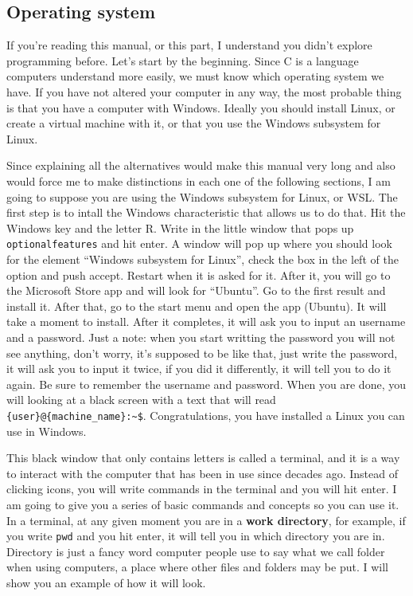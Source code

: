 \documentclass[a4paper]{article}
\begin{document}
\subsection{Operating system}
If you're reading this manual, or this part, I understand you didn't explore
programming before. Let's start by the beginning. Since C is a language
computers understand more easily, we must know which operating system we have.
If you have not altered your computer in any way, the most probable thing is
that you have a computer with Windows. Ideally you should install Linux, or
create a virtual machine with it, or that you use the Windows subsystem for
Linux.

Since explaining all the alternatives would make this manual very long and also
would force me to make distinctions in each one of the following sections, I am
going to suppose you are using the Windows subsystem for Linux, or WSL. The
first step is to intall the Windows characteristic that allows us to
do that. Hit the Windows key and the letter R. Write in the little window that
pops up \verb!optionalfeatures! and hit enter. A window will pop up
where you should look for the element ``Windows subsystem for Linux'', check the
box in the left of the option and push accept. Restart when it is asked for it.
After it, you will go to the Microsoft Store app and will look for ``Ubuntu''.
Go to the first result and install it. After that, go to the start menu and
open the app (Ubuntu). It will take a moment to install. After it completes,
it will ask you to input an username and a password. Just a note: when you start
writting the password you will not see anything, don't worry, it's supposed to
be like that, just write the password, it will ask you to input it twice, if
you did it differently, it will tell you to do it again. Be sure to remember
the username and password. When you are done, you will looking at a black screen
with a text that will read \verb!{user}@{machine_name}:~$!. Congratulations,
you have installed a Linux you can use in Windows.

This black window that only contains letters is called a terminal, and it is
a way to interact with the computer that has been in use since decades ago.
Instead of clicking icons, you will write commands in the terminal and you
will hit enter. I am going to give you a series of basic commands and
concepts so you can use it. In a terminal, at any given moment you are in a
\textbf{work directory}, for example, if you write \verb!pwd! and you hit enter,
it will tell you in which directory you are in. Directory is just a fancy word
computer people use to say what we call folder when using computers, a place
where other files and folders may be put.
I will show you an example of how it will look.
\end{document}
